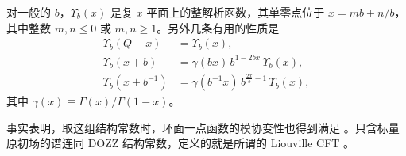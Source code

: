 

对一般的 $b$，$\Upsilon_b(x)$ 是复 $x$ 平面上的整解析函数，其单零点位于 $x=mb+n/b$，其中整数 $m,n\le0$ 或 $m,n\ge1$。另外几条有用的性质是
\begin{equation}\label{eq:3-65}
  \begin{aligned}
  \Upsilon_b(Q-x)&=\Upsilon_b(x),\\
  \Upsilon_b(x+b)&=\gamma(bx)\,b^{1-2bx}\,\Upsilon_b(x),\\
  \Upsilon_b(x+b^{-1})&=\gamma(b^{-1}x)\,b^{\frac{2x}{b}-1}\,\Upsilon_b(x),
  \end{aligned}
\end{equation}
其中 $\gamma(x)\equiv\Gamma(x)/\Gamma(1-x)$。


事实表明，取这组结构常数时，环面一点函数的模协变性也得到满足 \cite{r16}。只含标量原初场的谱连同 DOZZ 结构常数，定义的就是所谓的 Liouville CFT \cite{r15,r17}。


